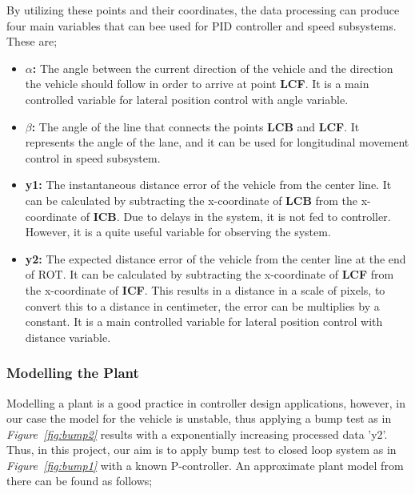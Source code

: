 \documentclass[a4paper,12pt]{article}
\begin{document}
\begin{enumerate}
				
	By utilizing these points and their coordinates, the data processing can produce four main variables that can bee used for PID controller and speed subsystems. These are;
	
	\begin{itemize}
		\item \textbf{$\alpha$:} The angle between the current direction of the vehicle and the direction the vehicle should follow in order to arrive at point \textbf{LCF}. It is a main controlled variable for lateral position control with angle variable.
		
		\item \textbf{$\beta$:} The angle of the line that connects the points \textbf{LCB} and \textbf{LCF}. It represents the angle of the lane, and it can be used for longitudinal movement control in speed subsystem.
		
		\item \textbf{y1:} The instantaneous distance error of the vehicle from the center line. It can be calculated by subtracting the x-coordinate of \textbf{LCB} from the x-coordinate of \textbf{ICB}. Due to delays in the system, it is not fed to controller. However, it is a quite useful variable for observing the system.  
		
		\item \textbf{y2:} The expected distance error of the vehicle from the center line at the end of ROT. It can be calculated by subtracting the x-coordinate of \textbf{LCF} from the x-coordinate of \textbf{ICF}. This results in a distance in a scale of pixels, to convert this to a distance in centimeter, the error can be multiplies by a constant. It is a main controlled variable for lateral position control with distance variable.
	
	
	\end{itemize}	 			

	
	\subsubsection*{Modelling the Plant}
	
	Modelling a plant is a good practice in controller design applications, however, in our case the model for the vehicle is unstable, thus applying a bump test as in \textit{Figure~\ref{fig:bump2}} results with a exponentially increasing processed data 'y2'. Thus, in this project, our aim is to apply bump test to closed loop system as in \textit{Figure~\ref{fig:bump1}} with a known P-controller. An approximate plant model from there can be found as follows;
	

\end{enumerate}
\end{document}

